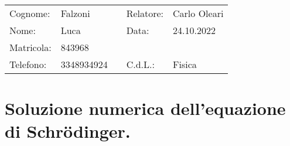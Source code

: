 \documentclass{article}
\begin{document}
\begin{tabular}{l l l l l}
    Cognome:    &    Falzoni     & \hspace{1cm} &   Relatore:     &   Carlo Oleari    \\
    Nome:       &    Luca        & \hspace{1cm} &   Data:         &   24.10.2022      \\                
    Matricola:  &    843968      & \hspace{1cm} &     &  \\
    Telefono:   &    3348934924  & \hspace{1cm} &    C.d.L.:       &   Fisica 
\end{tabular}


\section*{Soluzione numerica dell'equazione di Schr\"odinger.}
\end{document}
